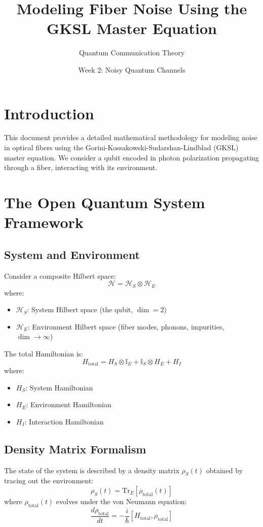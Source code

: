 \documentclass[12pt]{article}
\title{Modeling Fiber Noise Using the GKSL Master Equation}
\author{Quantum Communication Theory}
\date{Week 2: Noisy Quantum Channels}
\begin{document}
\maketitle

\section{Introduction}
This document provides a detailed mathematical methodology for modeling noise in optical fibers using the Gorini-Kossakowski-Sudarshan-Lindblad (GKSL) master equation. We consider a qubit encoded in photon polarization propagating through a fiber, interacting with its environment.

\section{The Open Quantum System Framework}

\subsection{System and Environment}
Consider a composite Hilbert space:
\[
\mathcal{H} = \mathcal{H}_S \otimes \mathcal{H}_E
\]
where:
\begin{itemize}
    \item $\mathcal{H}_S$: System Hilbert space (the qubit, $\dim = 2$)
    \item $\mathcal{H}_E$: Environment Hilbert space (fiber modes, phonons, impurities, $\dim \to \infty$)
\end{itemize}

The total Hamiltonian is:
\[
H_{\text{total}} = H_S \otimes \mathbb{I}_E + \mathbb{I}_S \otimes H_E + H_{I}
\]
where:
\begin{itemize}
    \item $H_S$: System Hamiltonian
    \item $H_E$: Environment Hamiltonian
    \item $H_I$: Interaction Hamiltonian
\end{itemize}

\subsection{Density Matrix Formalism}
The state of the system is described by a density matrix $\rho_S(t)$ obtained by tracing out the environment:
\[
\rho_S(t) = \text{Tr}_E[\rho_{\text{total}}(t)]
\]
where $\rho_{\text{total}}(t)$ evolves under the von Neumann equation:
\[
\frac{d\rho_{\text{total}}}{dt} = -\frac{i}{\hbar}[H_{\text{total}}, \rho_{\text{total}}]
\]
\end{document}
